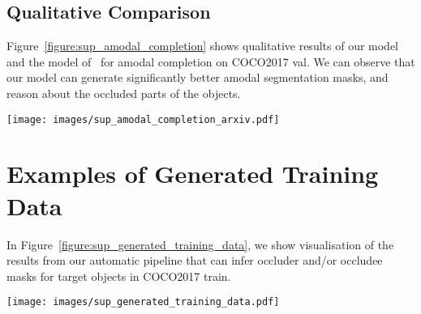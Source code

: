 \documentclass{bmvc2k}
\begin{document}
\subsection{Qualitative Comparison}
\label{sec:sup_amodal_qualitative_comparison}
Figure~\ref{figure:sup_amodal_completion} shows qualitative results of our model and the model of~\cite{zhan2020self}
for amodal completion on COCO2017 val. 
We can observe that our model can generate significantly better amodal segmentation masks, and reason about the occluded parts of the objects.

\begin{figure*}[!htb]
		\centering
		\texttt{[image: images/sup\_amodal\_completion\_arxiv.pdf]}
		\vspace{-2mm}
		\caption{\color{bmvc_blue} \textbf{Comparison of different amodal completion models.} Our amodal completion model performs significantly better than the model of~\cite{zhan2020self}.}
		\label{figure:sup_amodal_completion}
 		\vspace{-4mm}
\end{figure*}




\clearpage

\section{Examples of Generated Training Data}
\label{sec:sup_generated_training_data}
In Figure~\ref{figure:sup_generated_training_data}, 
we show visualisation of the results from our automatic pipeline that can infer
 occluder and/or occludee masks for 
target objects in COCO2017 train.


\begin{figure*}[h!]
		\centering
		\texttt{[image: images/sup\_generated\_training\_data.pdf]}
		\caption{\color{bmvc_blue} \textbf{More examples of automatically generated training data.} For each row, from left to right is: original image, the object of interest (target object), its occluder mask, and its occludee mask.} 
  \label{figure:sup_generated_training_data}
 		\vspace{-1.5mm}
\end{figure*}





\clearpage
\end{document}
